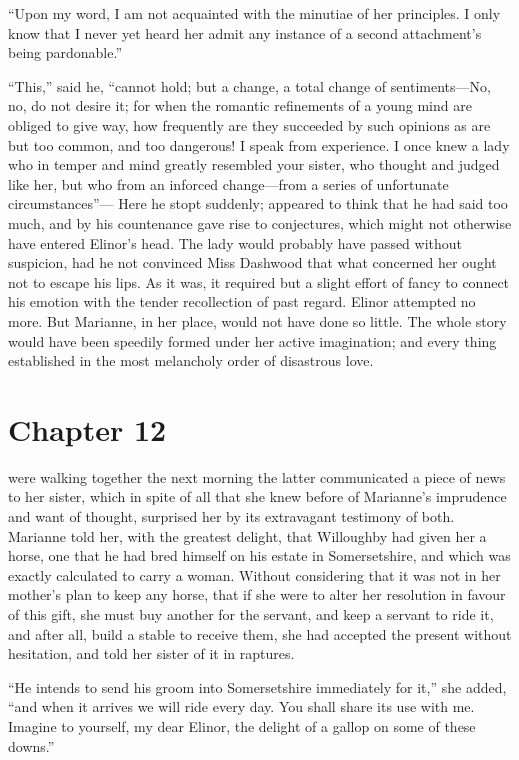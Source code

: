 ``Upon my word, I am not acquainted with the minutiae
of her principles.  I only know that I never yet heard her
admit any instance of a second attachment's being pardonable.''

``This,'' said he, ``cannot hold; but a change,
a total change of sentiments---No, no, do not desire it;
for when the romantic refinements of a young mind
are obliged to give way, how frequently are they
succeeded by such opinions as are but too common, and too
dangerous!  I speak from experience.  I once knew a lady
who in temper and mind greatly resembled your sister,
who thought and judged like her, but who from an inforced
change---from a series of unfortunate circumstances''---%
Here he stopt suddenly; appeared to think that he had said
too much, and by his countenance gave rise to conjectures,
which might not otherwise have entered Elinor's head.
The lady would probably have passed without suspicion,
had he not convinced Miss Dashwood that what concerned
her ought not to escape his lips.  As it was,
it required but a slight effort of fancy to connect his
emotion with the tender recollection of past regard.
Elinor attempted no more.  But Marianne, in her place,
would not have done so little.  The whole story would
have been speedily formed under her active imagination;
and every thing established in the most melancholy order
of disastrous love.



\chapter{Chapter 12}


 were walking together the
next morning the latter communicated a piece of news
to her sister, which in spite of all that she knew
before of Marianne's imprudence and want of thought,
surprised her by its extravagant testimony of both.
Marianne told her, with the greatest delight, that
Willoughby had given her a horse, one that he had bred
himself on his estate in Somersetshire, and which was
exactly calculated to carry a woman.  Without considering
that it was not in her mother's plan to keep any horse,
that if she were to alter her resolution in favour of
this gift, she must buy another for the servant, and
keep a servant to ride it, and after all, build a stable
to receive them, she had accepted the present without
hesitation, and told her sister of it in raptures.

``He intends to send his groom into Somersetshire
immediately for it,'' she added, ``and when it arrives we
will ride every day.  You shall share its use with me.
Imagine to yourself, my dear Elinor, the delight of a gallop
on some of these downs.''

